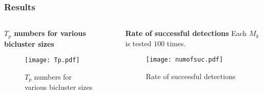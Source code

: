 \documentclass{beamer}
\begin{document}
\begin{frame}
    \frametitle{Results}
    \begin{columns}[T]
        \begin{column}{0.5\textwidth}
            \centering
            \textbf{$T_p$ numbers for various bicluster sizes}
            \begin{figure}[htb]
                \centering
                \texttt{[image: Tp.pdf]}
                \caption{$T_p$ numbers for various bicluster sizes}
                \label{fig:image3}
            \end{figure}
        \end{column}
        \begin{column}{0.5\textwidth}
            \textbf{Rate of successful detections}
            Each $M_k$ is tested $100$ times.
            \begin{figure}[htb]
                \centering
                \texttt{[image: numofsuc.pdf]}
                \caption{Rate of successful detections}
                \label{fig:image4}
            \end{figure}
        \end{column}
    \end{columns}
\end{frame}
\end{document}
